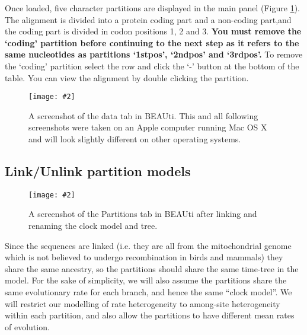 \documentclass[12pt]{article}
\newcommand{\includeimage}[2][]{%
\texttt{[image: \#2]}
}
\begin{document}
Once loaded, five character partitions are displayed in the main panel (Figure \ref{fig:BEAUTI_DataPartitions}). The alignment is divided into a protein coding part and a non-coding part,and the coding part is divided in codon positions 1, 2 and 3. 
{\bf You must remove the `coding' partition before continuing to the next step as it refers to the same nucleotides as partitions `1stpos', `2ndpos' and `3rdpos'.} To remove the `coding' partition select the row and click the `-' button at the bottom of the table. 
You can view the alignment by double clicking the partition.

\begin{figure}
\centering	
\includeimage[width=0.9\textwidth]{figures/BEAUti_DataPartitions}
\caption{A screenshot of the data tab in BEAUti. This and all following screenshots
were taken on an Apple computer running Mac OS X and will look slightly different on other operating systems.}
\label{fig:BEAUTI_DataPartitions}
\end{figure}

%
%

\subsection*{Link/Unlink partition models}

\begin{figure}
\centering	
\includeimage[width=0.9\textwidth]{figures/BEAUti_DataPartitions_final}
\caption{A screenshot of the Partitions tab in BEAUti after linking and renaming the clock model and tree.}
\label{fig:BEAUti_DataPartitions_final}
\end{figure}

Since the sequences are linked (i.e. they are all from the mitochondrial genome
which is not believed to undergo recombination in birds and mammals) they
share the same ancestry, so the partitions should share the same time-tree in
the model. For the sake of simplicity, we will also assume the partitions share
the same evolutionary rate for each branch, and hence the same ``clock model''.
We will restrict our modelling of rate heterogeneity to among-site heterogeneity
within each partition, and also allow the partitions to have different mean rates of evolution. 
\end{document}
